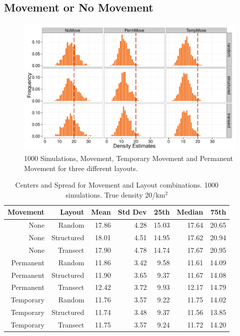 \documentclass[12pt]{article}
\begin{document}
\subsection{Movement or No Movement}
\begin{figure}

	\includegraphics[width=\textwidth]{../images/MovementSim2.pdf}
	\caption{1000 Simulations, Movement, Temporary Movement and Permanent Movement for three different layouts. \label{fig:sim2}}
		
\end{figure}
\begin{table}[h]

	\begin{tabular}{ r r| r r| r r r}
		Movement  & Layout     & Mean  & Std Dev & 25th  & Median & 75th  \\ \hline\hline
		None      & Random     & 17.86 & 4.28    & 15.03 & 17.64  & 20.65 \\
		None      & Structured & 18.01 & 4.51    & 14.95 & 17.62  & 20.94 \\
		None      & Transect   & 17.90 & 4.78    & 14.74 & 17.67  & 20.95 \\ \hline
		Permanent & Random     & 11.86 & 3.42    & 9.58  & 11.61  & 14.09 \\
		Permanent & Structured & 11.90 & 3.65    & 9.37  & 11.67  & 14.08 \\
		Permanent & Transect   & 12.42 & 3.72    & 9.93  & 12.17  & 14.79 \\ \hline
		Temporary & Random     & 11.76 & 3.57    & 9.22  & 11.75  & 14.02 \\
		Temporary & Structured & 11.74 & 3.48    & 9.37  & 11.56  & 13.85 \\
		Temporary & Transect   & 11.75 & 3.57    & 9.24  & 11.72  & 14.20
	\end{tabular}
	\caption{Centers and Spread for Movement and Layout combinations. 1000 simulations. True density 20/km$^2$}
	\label{table:sim2}
\end{table}
\end{document}
